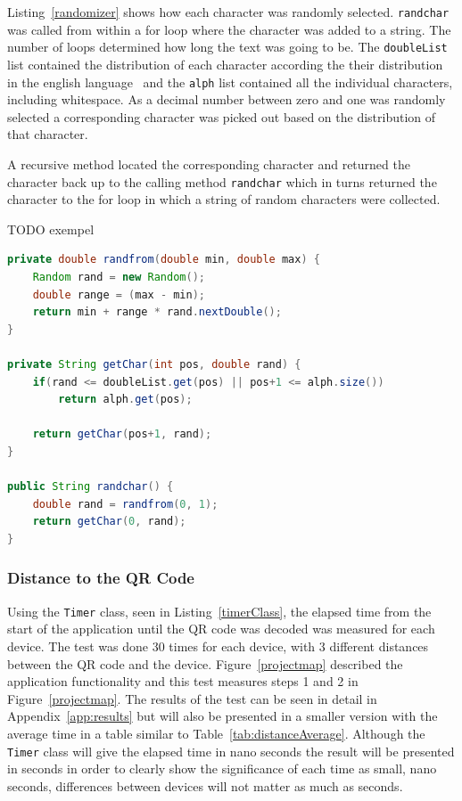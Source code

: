 Listing~\ref{randomizer} shows how each character was randomly selected. \texttt{randchar} was called from within a for loop where the character was added to a string. The number of loops determined how long the text was going to be. The \texttt{doubleList} list contained the distribution of each character according the their distribution in the english language~\cite{englishTextStat} and the \texttt{alph} list contained all the individual characters, including whitespace. As a decimal number between zero and one was randomly selected a corresponding character was picked out based on the distribution of that character.

A recursive method located the corresponding character and returned the character back up to the calling method \texttt{randchar} which in turns returned the character to the for loop in which a string of random characters were collected.

TODO exempel

\begin{lstlisting}[language=Java, caption={The randomizer class}, label=randomizer]
private double randfrom(double min, double max) {
	Random rand = new Random();
	double range = (max - min);
	return min + range * rand.nextDouble();
}

private String getChar(int pos, double rand) {
	if(rand <= doubleList.get(pos) || pos+1 <= alph.size())
		return alph.get(pos);
		
	return getChar(pos+1, rand);
}

public String randchar() {
	double rand = randfrom(0, 1);
	return getChar(0, rand);
}
\end{lstlisting}

\subsubsection{Distance to the QR Code}

Using the \texttt{Timer} class, seen in Listing~\ref{timerClass}, the elapsed time from the start of the application until the QR code was decoded was measured for each device. The test was done 30 times for each device, with 3 different distances between the QR code and the device. Figure~\ref{projectmap} described the application functionality and this test measures steps 1 and 2 in Figure~\ref{projectmap}. The results of the test can be seen in detail in Appendix~\ref{app:results} but will also be presented in a smaller version with the average time in a table similar to Table~\ref{tab:distanceAverage}. Although the \texttt{Timer} class will give the elapsed time in nano seconds the result will be presented in seconds in order to clearly show the significance of each time as small, nano seconds, differences between devices will not matter as much as seconds.

